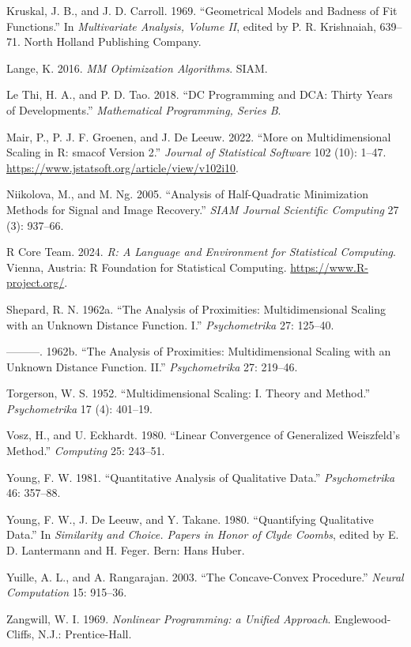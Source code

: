 \documentclass[
  12pt,
  letterpaper,
  DIV=11,
  numbers=noendperiod]{scrartcl}
\newlength{\cslhangindent}
\newenvironment{CSLReferences}[2] %
 {\begin{list}{}{%
  \setlength{\itemindent}{0pt}
  \setlength{\leftmargin}{0pt}
  \setlength{\parsep}{0pt}
  \ifodd #1
   \setlength{\leftmargin}{\cslhangindent}
   \setlength{\itemindent}{-1\cslhangindent}
  \fi
  \setlength{\itemsep}{#2\baselineskip}}}
 {\end{list}}
\theoremstyle{plain}
\theoremstyle{remark}
\begin{document}
\begin{CSLReferences}{1}{0}
Kruskal, J. B., and J. D. Carroll. 1969. {``{Geometrical Models and
Badness of Fit Functions}.''} In \emph{Multivariate Analysis, Volume
II}, edited by P. R. Krishnaiah, 639--71. North Holland Publishing
Company.

Lange, K. 2016. \emph{MM Optimization Algorithms}. SIAM.

Le Thi, H. A., and P. D. Tao. 2018. {``{DC Programming and DCA: Thirty
Years of Developments}.''} \emph{Mathematical Programming, Series B}.

Mair, P., P. J. F. Groenen, and J. De Leeuw. 2022. {``{More on
Multidimensional Scaling in R: smacof Version 2}.''} \emph{Journal of
Statistical Software} 102 (10): 1--47.
\url{https://www.jstatsoft.org/article/view/v102i10}.

Niikolova, M., and M. Ng. 2005. {``Analysis of Half-Quadratic
Minimization Methods for Signal and Image Recovery.''} \emph{SIAM
Journal Scientific Computing} 27 (3): 937--66.

R Core Team. 2024. \emph{R: A Language and Environment for Statistical
Computing}. {Vienna, Austria}: R Foundation for Statistical Computing.
\url{https://www.R-project.org/}.

Shepard, R. N. 1962a. {``{The Analysis of Proximities: Multidimensional
Scaling with an Unknown Distance Function. I}.''} \emph{Psychometrika}
27: 125--40.

---------. 1962b. {``{The Analysis of Proximities: Multidimensional
Scaling with an Unknown Distance Function. II}.''} \emph{Psychometrika}
27: 219--46.

Torgerson, W. S. 1952. {``{Multidimensional Scaling: I. Theory and
Method}.''} \emph{Psychometrika} 17 (4): 401--19.

Vosz, H., and U. Eckhardt. 1980. {``{Linear Convergence of Generalized
{W}eiszfeld's Method}.''} \emph{Computing} 25: 243--51.

Young, F. W. 1981. {``{Quantitative Analysis of Qualitative Data}.''}
\emph{Psychometrika} 46: 357--88.

Young, F. W., J. De Leeuw, and Y. Takane. 1980. {``Quantifying
Qualitative Data.''} In \emph{Similarity and Choice. Papers in Honor of
Clyde Coombs}, edited by E. D. Lantermann and H. Feger. Bern: Hans
Huber.

Yuille, A. L., and A. Rangarajan. 2003. {``{The Concave-Convex
Procedure}.''} \emph{Neural Computation} 15: 915--36.

Zangwill, W. I. 1969. \emph{{Nonlinear Programming: a Unified
Approach}}. Englewood-Cliffs, N.J.: Prentice-Hall.

\end{CSLReferences}
\end{document}
